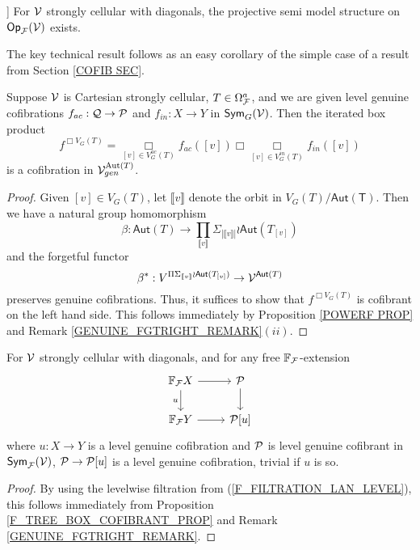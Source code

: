\documentclass[a4paper,10pt]{article}%
\begin{document}
\begin{theorem}
        \label{OP_F_SEMI_MODEL_THM}] 
        For $\V$ strongly cellular with diagonals, 
        the projective semi model structure on $\Op_\F(\V)$ exists.
\end{theorem}

The key technical result follows as an easy corollary of the simple case of a result from Section \ref{COFIB SEC}.

\begin{proposition}
        \label{F_TREE_BOX_COFIBRANT_PROP} 
        Suppose $\V$ is Cartesian strongly cellular, $T\in \Omega_\F^a$, and we are given level genuine cofibrations $f_{ac}: \mathcal Q \to \P$ and $f_{in}: X \to Y$ in $\Sym_G(\V)$. Then the iterated box product
        \[ 
        f^{\Box V_G(T)} = \mathop{\Box}\limits_{[v] \in V_G^{ac}(T)} f_{ac}([v]) \Box \mathop{\Box}\limits_{[v]\in V_G^{in}(T)}f_{in}([v]) 
        \] 
        is a cofibration in $\V^{\mathrm{Aut}(T)}_{gen}$.  
\end{proposition}
\begin{proof}
        Given $[v]\in V_G(T)$, let $\llbracket v \rrbracket$ denote the orbit in $V_G(T)/\mathsf{Aut(T)}$. Then we have a natural group homomorphism
        \[ 
        \beta: \mathsf{Aut}(T) \to \prod\limits_{\llbracket v \rrbracket} \Sigma_{|\llbracket v \rrbracket |} \wr \mathsf{Aut}(T_{[v]})
        \]
        and the forgetful functor 
        \[
        \beta^*: V^{\Pi \Sigma_{\llbracket v \rrbracket} \wr \mathsf{Aut}(T_{[v]})} \to \V^{\mathsf{Aut}(T)}
        \]
        preserves genuine cofibrations. Thus, it suffices to show that $f^{\Box V_G(T)}$ is cofibrant on the left hand side. This follows immediately by Proposition \ref{POWERF PROP} and Remark \ref{GENUINE_FGTRIGHT_REMARK}$(ii)$.
\end{proof} 

\begin{corollary}\label{F_CELLULAR_LEVEL_COFIB_PROP} 
        For $\V$ strongly cellular with diagonals, and for any free $\mathbb F_\F$-extension  
        \[ 
        \begin{tikzcd} 
                \mathbb F_\F X \arrow[d, "u"'] \arrow[r] & \P \arrow[d]\\ 
                \mathbb F_\F Y \arrow[r] & \P[u] 
        \end{tikzcd} 
        \] 
        where $u: X \to Y$ is a level genuine cofibration and $\P$ is level genuine cofibrant in $\Sym_\F(\V)$, $\P \to \P[u]$ is a level genuine cofibration, trivial if $u$ is so. 
\end{corollary}  
\begin{proof} 
        By using the levelwise filtration from (\ref{F_FILTRATION_LAN_LEVEL}), this follows immediately from Proposition \ref{F_TREE_BOX_COFIBRANT_PROP} and Remark \ref{GENUINE_FGTRIGHT_REMARK}. 
\end{proof} 
\end{document}
